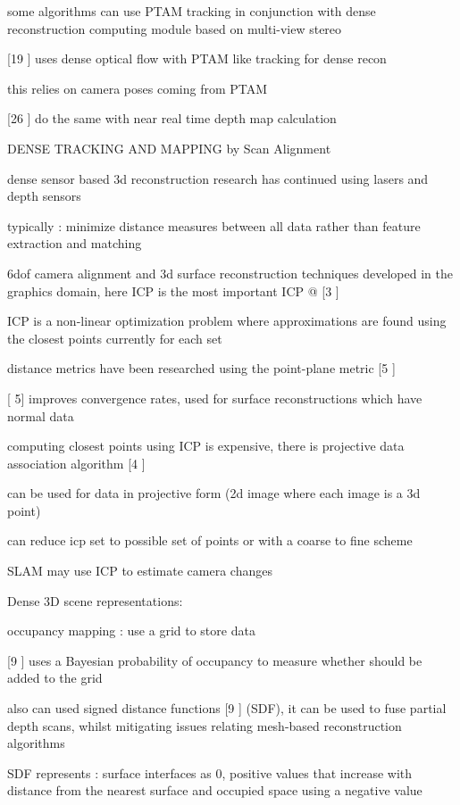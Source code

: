 some algorithms can use PTAM tracking in conjunction with dense reconstruction computing module based on multi-view stereo

[19 \cite{Newcombe10Live}] uses dense optical flow with PTAM like tracking for dense recon

this relies on camera poses coming from PTAM

[26 \cite{Stuhmer10Real}] do the same with near real time depth map calculation

DENSE TRACKING AND MAPPING by Scan Alignment

dense sensor based 3d reconstruction research has continued using lasers and depth sensors

typically : minimize distance measures between all data rather than feature extraction and matching

6dof camera alignment and 3d surface reconstruction techniques developed in the graphics domain, here ICP is the most important
ICP @ [3 \cite{Besl92Method} ]

ICP is a non-linear optimization problem where approximations are found using the closest points currently for each
set

distance metrics have been researched using the point-plane metric [5 \cite{Chen92Object}]

[\cite{Chen92Object} 5] improves convergence rates, used for surface reconstructions which have normal data

computing closest points using ICP is expensive, there is projective data association algorithm [4 \cite{Blais95Registering}]

can be used for data in projective form (2d image where each image is a 3d point)

can reduce icp set to possible set of points or with a coarse to fine scheme

SLAM may use ICP to estimate camera changes

Dense 3D scene representations:

occupancy mapping : use a grid to store data

[9 \cite{Elfes87Sensor}] uses a Bayesian probability of occupancy to measure whether should be added to the grid

also can used signed distance functions [9 \cite{Elfes87Sensor}] (SDF), it can be used to fuse partial depth scans, whilst mitigating
issues relating mesh-based reconstruction algorithms

SDF represents : surface interfaces as 0, positive values that increase with distance from the nearest surface
and occupied space using a negative value

